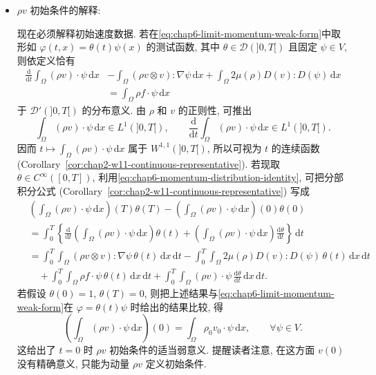\begin{sloppypar}
\begin{itemize}
 \item $\rho v$ 初始条件的解释:

 现在必须解释初始速度数据. 若在\eqref{eq:chap6-limit-momentum-weak-form}中取形如 $\varphi(t,x)=\theta(t)\psi(x)$ 的测试函数, 其中 $\theta\in\mathcal D(]0,T[)$ 且固定 $\psi\in V$, 则依定义恰有
 \begin{equation}
 \begin{aligned}
 \frac{\mathrm d}{\mathrm dt}\int_\Omega(\rho v)\cdot\psi\,\mathrm dx
 &-\int_\Omega(\rho v\otimes v):\nabla\psi\,\mathrm dx
 +\int_\Omega2\mu(\rho)D(v):D(\psi)\,\mathrm dx\\
 &=\int_\Omega\rho f\cdot\psi\,\mathrm dx
 \end{aligned}
 \label{eq:chap6-momentum-distribution-identity}
 \end{equation}
 于 $\mathcal D'(]0,T[)$ 的分布意义. 由 $\rho$ 和 $v$ 的正则性, 可推出
 \[
  \int_\Omega(\rho v)\cdot\psi\,\mathrm dx\in L^1(]0,T[),
  \qquad
  \frac{\mathrm d}{\mathrm dt}\int_\Omega(\rho v)\cdot\psi\,\mathrm dx
  \in L^1(]0,T[).
 \]
 因而 $t\mapsto\int_\Omega(\rho v)\cdot\psi\,\mathrm dx$ 属于 $W^{1,1}(]0,T[)$, 所以可视为 $t$ 的连续函数 (Corollary~\ref{cor:chap2-w11-continuous-representative}). 若现取 $\theta\in C^\infty([0,T])$, 利用\eqref{eq:chap6-momentum-distribution-identity}, 可把分部积分公式 (Corollary~\ref{cor:chap2-w11-continuous-representative}) 写成
 \[
 \begin{aligned}
 &\left(\int_\Omega(\rho v)\cdot\psi\,\mathrm dx\right)(T)\theta(T)
 -\left(\int_\Omega(\rho v)\cdot\psi\,\mathrm dx\right)(0)\theta(0)\\
 &=\int_0^T\left\{
 \frac{\mathrm d}{\mathrm dt}\left(\int_\Omega(\rho v)\cdot\psi\,\mathrm dx\right)\theta(t)
 +\left(\int_\Omega(\rho v)\cdot\psi\,\mathrm dx\right)\frac{\mathrm d\theta}{\mathrm dt}
 \right\}\,\mathrm dt\\
 &=\int_0^T\int_\Omega(\rho v\otimes v):\nabla\psi\,\theta(t)\,\mathrm dx\,\mathrm dt
 -\int_0^T\int_\Omega2\mu(\rho)D(v):D(\psi)\,\theta(t)\,\mathrm dx\,\mathrm dt\\
 &\quad+\int_0^T\int_\Omega\rho f\cdot\psi\,\theta(t)\,\mathrm dx\,\mathrm dt
 +\int_0^T\int_\Omega(\rho v)\cdot\psi\,\frac{\mathrm d\theta}{\mathrm dt}
 \,\mathrm dx\,\mathrm dt.
 \end{aligned}
 \]
 若假设 $\theta(0)=1$, $\theta(T)=0$, 则把上述结果与\eqref{eq:chap6-limit-momentum-weak-form}在 $\varphi=\theta(t)\psi$ 时给出的结果比较, 得
 \[
  \left(\int_\Omega(\rho v)\cdot\psi\,\mathrm dx\right)(0)
  =\int_\Omega\rho_0v_0\cdot\psi\,\mathrm dx,
  \qquad\forall\psi\in V.
 \]
 这给出了 $t=0$ 时 $\rho v$ 初始条件的适当弱意义. 提醒读者注意, 在这方面 $v(0)$ 没有精确意义, 只能为动量 $\rho v$ 定义初始条件.
\end{itemize}


\end{sloppypar}
